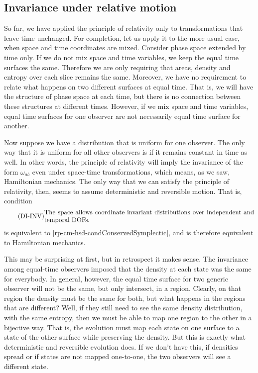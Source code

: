 \subsection{Invariance under relative motion}

So far, we have applied the principle of relativity only to transformations that leave time unchanged. For completion, let us apply it to the more usual case, when space and time coordinates are mixed. Consider phase space extended by time only. If we do not mix space and time variables, we keep the equal time surfaces the same. Therefore we are only requiring that areas, density and entropy over each slice remains the same. Moreover, we have no requirement to relate what happens on two different surfaces at equal time. That is, we will have the structure of phase space at each time, but there is no connection between these structures at different times. However, if we mix space and time variables, equal time surfaces for one observer are not necessarily equal time surface for another.

Now suppose we have a distribution that is uniform for one observer. The only way that it is uniform for all other observers is if it remains constant in time as well. In other words, the principle of relativity will imply the invariance of the form $\omega_{ab}$ even under space-time transformations, which means, as we saw, Hamiltonian mechanics. The only way that we can satisfy the principle of relativity, then, seems to assume deterministic and reversible motion. That is, condition
\begin{equation}\tag{DI-INV}\label{rp-cm-hmd-condInvariantDensityTime}
	\eqtext{The space allows coordinate invariant distributions over independent and temporal DOFs.}
\end{equation}
is equivalent to \ref{rp-cm-hsd-condConservedSymplectic}, and is therefore equivalent to Hamiltonian mechanics.

This may be surprising at first, but in retrospect it makes sense. The invariance among equal-time observers imposed that the density at each state was the same for everybody. In general, however, the equal time surface for two generic observer will not be the same, but only intersect, in a region. Clearly, on that region the density must be the same for both, but what happens in the regions that are different? Well, if they still need to see the same density distribution, with the same entropy, then we must be able to map one region to the other in a bijective way. That is, the evolution must map each state on one surface to a state of the other surface while preserving the density. But this is exactly what deterministic and reversible evolution does. If we don't have this, if densities spread or if states are not mapped one-to-one, the two observers will see a different state.

